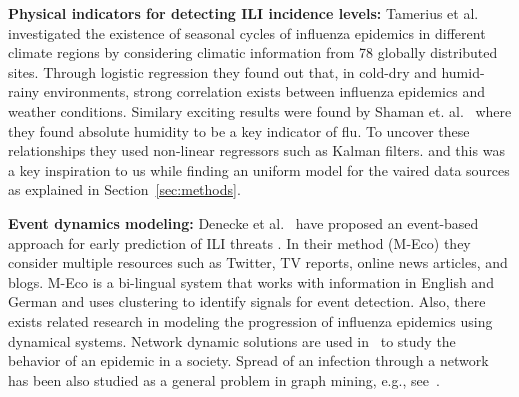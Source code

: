\textbf{Physical indicators for detecting ILI incidence levels:} 
Tamerius et al.~\cite{ref9} investigated the existence of seasonal 
cycles of influenza epidemics in different climate regions
by considering climatic information from 78 globally distributed sites. Through 
logistic regression they found out that, in cold-dry and humid-rainy
environments, strong correlation exists between influenza epidemics and
weather conditions. Similary exciting results were found 
by Shaman et. al.~\cite{Shaman_orig_humidity_link, Shaman_humidity_USA}
where they found absolute humidity to be a key indicator of flu. To uncover 
these relationships they used non-linear regressors such as Kalman filters.
and this was a key inspiration to us while finding an uniform model for the
vaired data sources as explained in Section~\ref{sec:methods}.

%
\textbf{Event dynamics modeling:}
Denecke et al.~\cite{ref3}
have proposed an event-based approach for early prediction
of ILI threats \cite{ref3}. In their method (M-Eco) they consider
multiple resources such as Twitter, TV reports, online news articles,
and blogs. M-Eco is a bi-lingual system that works with information in
English and German and uses clustering to identify signals for event detection.
Also, there exists related research in modeling the progression of influenza epidemics using
dynamical systems. Network dynamic solutions are used in~\cite{ref11} 
to study the behavior of an epidemic in a society. Spread of an infection through a network 
has been also studied as a general problem in graph mining, e.g., see~\cite{ref13,ref14}.
 
